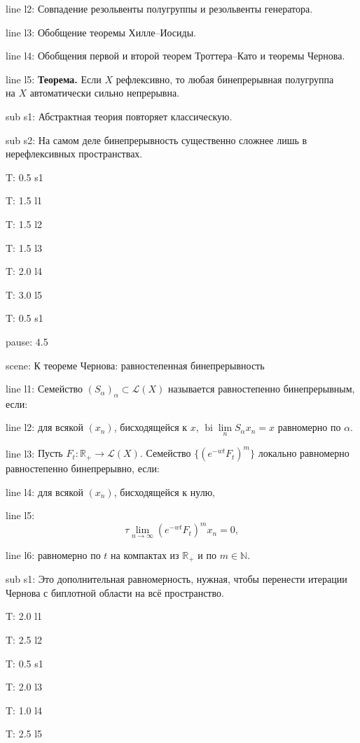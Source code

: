 \documentclass[a4paper,11pt]{article}
\newcommand{\R}{\mathbb{R}}
\newcommand{\N}{\mathbb{N}}
\begin{document}
line l2: {Совпадение резольвенты полугруппы и резольвенты генератора.}

line l3: {Обобщение теоремы Хилле--Иосиды.}

line l4: {Обобщения первой и второй теорем Троттера--Като и теоремы Чернова.}

line l5: {\textbf{Теорема.} Если $X$ рефлексивно, то любая бинепрерывная полугруппа\\ на $X$ автоматически сильно непрерывна.}


sub s1: {Абстрактная теория повторяет классическую.}

sub s2: {На самом деле бинепрерывность существенно сложнее лишь в нерефлексивных пространствах.}


T: 0.5 s1

T: 1.5 l1

T: 1.5 l2

T: 1.5 l3

T: 2.0 l4

T: 3.0 l5

T: 0.5 s1

pause: 4.5



scene: {К теореме Чернова: равностепенная бинепрерывность}

line l1: {Семейство $(S_\alpha)_\alpha\subset\mathcal{L}(X)$ называется равностепенно бинепрерывным, если:}

line l2: {для всякой $(x_n)$, бисходящейся к $x$, $\operatorname{bi}\lim\limits_n S_\alpha x_n=x$ равномерно по $\alpha$.}

line l3: {Пусть $F_t:\R_+\to\mathcal{L}(X)$. Семейство $\{(e^{-wt}F_t)^m\}$ локально равномерно равностепенно бинепрерывно, если:}

line l4: {для всякой $(x_n)$, бисходящейся к нулю,}

line l5: {$$\tau\lim\limits_{n\to\infty}(e^{-wt}F_t)^m x_n=0,$$}

line l6: {равномерно по $t$ на компактах из $\R_+$ и по $m\in\N$.}


sub s1: {Это дополнительная равномерность, нужная, чтобы перенести итерации Чернова с биплотной области на всё пространство.}


T: 2.0 l1

T: 2.5 l2

T: 0.5 s1

T: 2.0 l3

T: 1.0 l4

T: 2.5 l5
\end{document}
